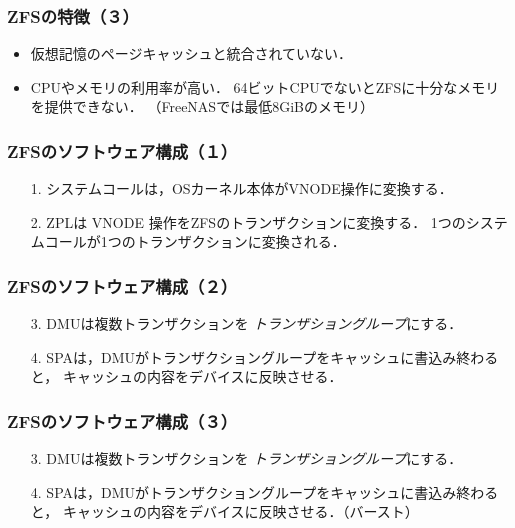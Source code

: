 \documentclass[unicode]{beamer}                   %
\begin{document}
\begin{frame}
  \frametitle{ZFSの特徴（３）}
  \begin{itemize}
  \item 仮想記憶のページキャッシュと統合されていない．
  \item CPUやメモリの利用率が高い．
    64ビットCPUでないとZFSに十分なメモリを提供できない．
    （FreeNASでは最低8GiBのメモリ）
  \end{itemize}
  \vfill
\end{frame}

\begin{frame}[fragile]
  \frametitle{ZFSのソフトウェア構成（１）}
  \begin{enumerate}
  \item[1.] システムコールは，OSカーネル本体がVNODE操作に変換する．
  \item[2.] ZPLは VNODE 操作をZFSのトランザクションに変換する．
    1つのシステムコールが1つのトランザクションに変換される．
  \end{enumerate}  
  \vfill
\end{frame}

\begin{frame}[fragile]
  \frametitle{ZFSのソフトウェア構成（２）}
  \begin{enumerate}
  \item[3.] DMUは複数トランザクションを
    \emph{トランザショングループ}にする．
  \item[4.] SPAは，DMUがトランザクショングループをキャッシュに書込み終わると，
    キャッシュの内容をデバイスに反映させる．
  \end{enumerate}  
  \vfill
\end{frame}

\begin{frame}[fragile]
  \frametitle{ZFSのソフトウェア構成（３）}
  \begin{enumerate}
  \item[3.] DMUは複数トランザクションを
    \emph{トランザショングループ}にする．
  \item[4.] SPAは，DMUがトランザクショングループをキャッシュに書込み終わると，
    キャッシュの内容をデバイスに反映させる．（バースト）
  \end{enumerate}  
  \vfill
\end{frame}
\end{document}
